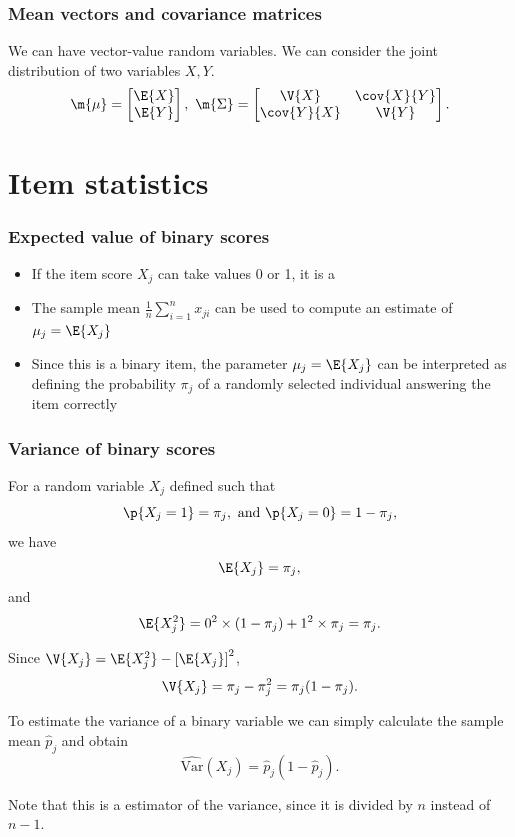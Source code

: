 \documentclass[compress]{beamer}\usepackage[]{graphicx}\usepackage[]{xcolor}
\begin{document}
\begin{frame}[fragile]
  \frametitle{Mean vectors and covariance matrices}
    We can have vector-value random variables. We can consider the joint distribution of two variables $X, Y$.
      \begin{equation*}
        \m{\mu} =
          \begin{bmatrix}
            \E{X} \\
            \E{Y}
          \end{bmatrix},\ %
        \m{\Sigma} =
          \begin{bmatrix}
            \V{X}       &\cov{X}{Y} \\
            \cov{Y}{X}  &\V{Y}
          \end{bmatrix}.
      \end{equation*}
\end{frame}


\section{Item statistics}

\begin{frame}[fragile]
  \frametitle{Expected value of binary scores}
    \begin{itemize}
      \item If the item score $X_j$ can take values 0 or 1, it is a 
      \item The sample mean $\frac{1}{n}\sum_{i=1}^n x_{ji}$ can be used to compute an estimate of $\mu_j = \E{X_j}$
      \item Since this is a binary item, the parameter $\mu_j=\E{X_j}$ can be interpreted as defining the probability $\pi_j$ of a randomly selected individual answering the item correctly
    \end{itemize}
\end{frame}


\begin{frame}[fragile]
  \frametitle{Variance of binary scores}
    For a random variable $X_j$ defined such that
      \[ \p{X_j = 1} = \pi_j,\ \text{and } \p{X_j = 0} = 1 - \pi_j, \]
    we have
      \[ \E{X_j} = \pi_j, \]
    and
      \[ \E{X_j^2} = 0^2 \times (1 - \pi_j) + 1^2 \times \pi_j= \pi_j. \]

    Since $\V{X_j} = \E{X_j^2} - \left[ \E{X_j} \right]^2$,
      \[ \V{X_j} = \pi_j - \pi_j^2 = \pi_j ( 1 - \pi_j ). \]

    To estimate the variance of a binary variable we can simply calculate the sample mean $\hat{p}_j$ and obtain
      \[ \hat{\mathrm{Var}} \left( X_j \right) = \hat{p}_j ( 1 - \hat{p}_j ). \]

    Note that this is a  estimator of the variance, since it is divided by $n$ instead of $n - 1$.
\end{frame}
\end{document}
